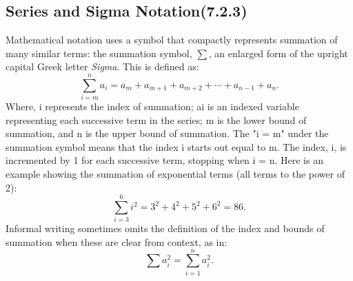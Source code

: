 
\subsection*{Series and Sigma Notation(7.2.3)}
Mathematical notation uses a symbol that compactly represents summation of many similar terms: the summation symbol, $\sum$, an enlarged form of the upright capital Greek letter \textit{Sigma}. This is defined as:
\[\sum_{i=m}^n a_i = a_m + a_{m+1} + a_{m+2} +\cdots+ a_{n-1} + a_n. \]
Where, i represents the index of summation; ai is an indexed variable representing each successive term in the series; m is the lower bound of summation, and n is the upper bound of summation. The "i = m" under the summation symbol means that the index i starts out equal to m. The index, i, is incremented by 1 for each successive term, stopping when i = n.
Here is an example showing the summation of exponential terms (all terms to the power of 2):
\[\sum_{i=3}^6 i^2 = 3^2+4^2+5^2+6^2 = 86.\]
Informal writing sometimes omits the definition of the index and bounds of summation when these are clear from context, as in:
\[\sum a_i^2 = \sum_{i=1}^n a_i^2.\]


